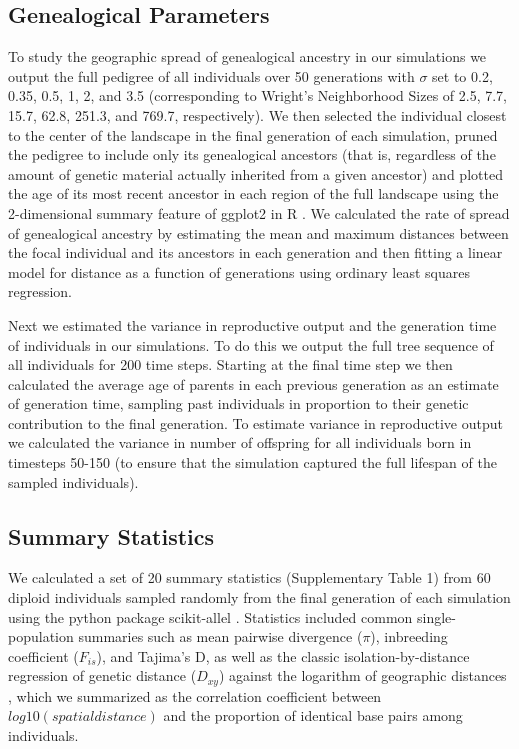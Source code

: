 \documentclass[9pt,twocolumn,twoside,lineno]{gsajnl}
\begin{document}
\subsection{Genealogical Parameters}
To study the geographic spread of genealogical ancestry in our simulations we output the full pedigree of all individuals over 50 generations with $\sigma$ set to 0.2, 0.35, 0.5, 1, 2, and 3.5 (corresponding to Wright's Neighborhood Sizes of 2.5, 7.7, 15.7, 62.8, 251.3, and 769.7, respectively). We then selected the individual closest to the center of the landscape in the final generation of each simulation, pruned the pedigree to include only its genealogical ancestors (that is, regardless of the amount of genetic material actually inherited from a given ancestor) and plotted the age of its most recent ancestor in each region of the full landscape using the 2-dimensional summary feature of ggplot2 in R \citep{Wickham2016}. We calculated the rate of spread of genealogical ancestry by estimating the mean and maximum distances between the focal individual and its ancestors in each generation and then fitting a linear model for distance as a function of generations using ordinary least squares regression. 

Next we estimated the variance in reproductive output and the generation time of individuals in our simulations. To do this we output the full tree sequence of all individuals for 200 time steps. Starting at the final time step we then calculated the average age of parents in each previous generation as an estimate of generation time, sampling past individuals in proportion to their genetic contribution to the final generation. To estimate variance in reproductive output we calculated the variance in number of offspring for all individuals born in timesteps 50-150 (to ensure that the simulation captured the full lifespan of the sampled individuals). 

\subsection{Summary Statistics}
We calculated a set of 20 summary statistics (Supplementary Table 1) from 60 diploid individuals sampled randomly from the final generation of each simulation using the python package scikit-allel \citep{Miles2017}. Statistics included common single-population summaries such as mean pairwise divergence ($\pi$), inbreeding coefficient ($F_{is}$), and Tajima's D, as well as the classic isolation-by-distance regression of genetic distance ($D_{xy}$) against the logarithm of geographic distances \citep{Rousset1997}, which we summarized as the correlation coefficient between $log10(spatial distance)$ and the proportion of identical base pairs among individuals. 
\end{document}
